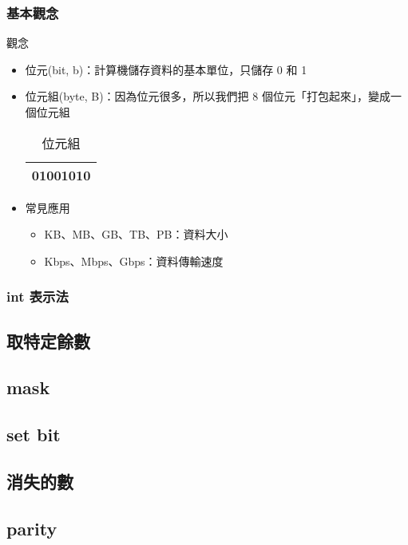 \documentclass[utf8]{beamer}
\begin{document}
\begin{CJK}{UTF8}{bkai}
\begin{frame}[fragile]
  \frametitle{基本觀念}
  \begin{exampleblock}{觀念}
    \begin{itemize}[<+->]
    \item 位元(bit, b)：計算機儲存資料的基本單位，只儲存 \alert{0 和 1}
    \item 位元組(byte, B)：因為位元很多，所以我們把 8 個位元「打包起來」，變成一個位元組
      \begin{table}
        \begin{tabular}{|c|}
        \hline
        01001010\\
        \hline
        \end{tabular}
        \caption{位元組}
      \end{table}
    \item 常見應用
      \begin{itemize}[<+->]
      \item KB、MB、GB、TB、PB：資料大小
      \item Kbps、Mbps、Gbps：資料傳輸速度
      \end{itemize}
    \end{itemize}
  \end{exampleblock}
\end{frame}

\begin{frame}
  \frametitle{int 表示法}
\end{frame}

\subsection{取特定餘數}

\subsection{mask}

\subsection{set bit}

\subsection{消失的數}

\subsection{parity}


\end{CJK}
\end{document}
